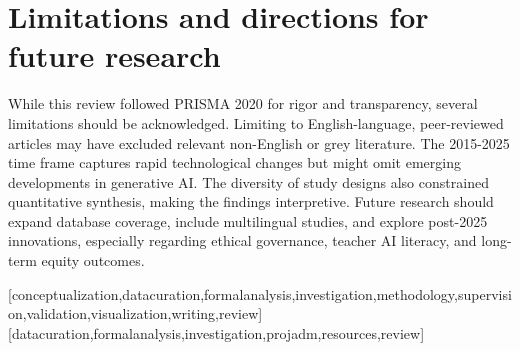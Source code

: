 \documentclass[english]{textolivre}
\begin{document}
\section{Limitations and directions for future research}
While this review followed PRISMA 2020 for rigor and transparency, several limitations should be acknowledged. Limiting to English-language, peer-reviewed articles may have excluded relevant non-English or grey literature. The 2015-2025 time frame captures rapid technological changes but might omit emerging developments in generative AI. The diversity of study designs also constrained quantitative synthesis, making the findings interpretive. Future research should expand database coverage, include multilingual studies, and explore post-2025 innovations, especially regarding ethical governance, teacher AI literacy, and long-term equity outcomes.


\printbibliography\label{sec-bib}


\begin{contributors}
[conceptualization,datacuration,formalanalysis,investigation,methodology,supervision,validation,visualization,writing,review]
[datacuration,formalanalysis,investigation,projadm,resources,review]
\end{contributors}

\begin{dataavailability}
\end{dataavailability}
\end{document}
